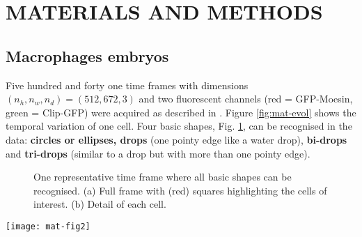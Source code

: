 \vspace{-0.4em}
\section{MATERIALS AND METHODS}\label{sec:matmet}
\subsection{Macrophages embryos}\label{sec:macrophages}
Five hundred and forty one time frames with dimensions
$(n_h, n_w, n_d) = (512, 672, 3)$ and two  fluorescent channels
(red = GFP-Moesin, green = Clip-GFP) were
acquired as described in \cite{Stramer2010}.
Figure \ref{fig:mat-evol} shows the temporal variation of one cell.
Four basic shapes, Fig. \ref{fig:mat-cellframe}, can be recognised in the data:
\textbf{circles or ellipses, drops} (one pointy edge like a water drop),
\textbf{bi-drops} and \textbf{tri-drops} (similar to a drop but with more than one pointy edge).
\begin{figure}[hbpt]
\vspace{-0.1cm}
    \centering
    \caption[One representative time frame %
    ]{
      \small
      One representative time frame where all basic shapes can be recognised.
      (a) Full frame  with (red) squares highlighting the cells
      of interest. (b) Detail of each cell.
      }
    \label{fig:mat-cellframe}
\end{figure}
\vspace{-1em}
\begin{figure*}[hbpt]
    \centering
    \texttt{[image: mat-fig2]}
    \caption[Evolution of a cell shape in time.]{
    \small
    Evolution of a cell shape in time. The cell is shown
    in 8 different instances from 50 consecutive time frames.
    }
    \label{fig:mat-evol}
\end{figure*}
\vspace{-1em}
